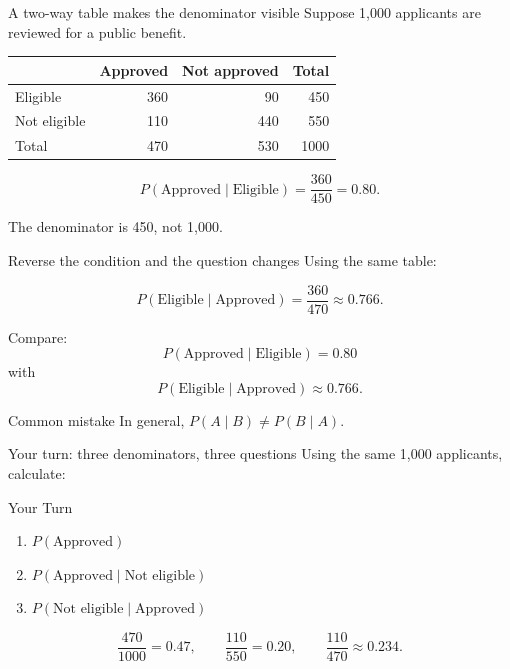 \documentclass[11pt,aspectratio=169]{beamer}
\newcommand{\yourturn}[1]{%
\begin{center}
\begin{minipage}{0.90\textwidth}
\begin{alertblock}{Your Turn}
#1
\end{alertblock}
\end{minipage}
\end{center}}
\newcommand{\prob}[1]{P\!\left(#1\right)}
\newcommand{\condprob}[2]{P\!\left(#1\mid #2\right)}
\begin{document}
\begin{frame}{A two-way table makes the denominator visible}
Suppose 1,000 applicants are reviewed for a public benefit.

\begin{center}
\renewcommand{\arraystretch}{1.25}
\begin{tabular}{lrrr}
\toprule
 & \textbf{Approved} & \textbf{Not approved} & \textbf{Total} \\
\midrule
Eligible & 360 & 90 & 450 \\
Not eligible & 110 & 440 & 550 \\
\midrule
Total & 470 & 530 & 1000 \\
\bottomrule
\end{tabular}
\end{center}

\vspace{0.7em}
\[
\condprob{\text{Approved}}{\text{Eligible}}
=\frac{360}{450}=\boxed{0.80}.
\]

The denominator is \alert{450}, not 1,000.
\end{frame}

\begin{frame}{Reverse the condition and the question changes}
Using the same table:

\[
\condprob{\text{Eligible}}{\text{Approved}}
=\frac{360}{470}\approx\boxed{0.766}.
\]

Compare:
\[
\condprob{\text{Approved}}{\text{Eligible}}=0.80
\]
with
\[
\condprob{\text{Eligible}}{\text{Approved}}\approx0.766.
\]

\vfill
\begin{alertblock}{Common mistake}
In general, $\condprob{A}{B}\neq\condprob{B}{A}$.
\end{alertblock}
\end{frame}

\begin{frame}{Your turn: three denominators, three questions}
Using the same 1,000 applicants, calculate:

\yourturn{\begin{enumerate}
  \item $\prob{\text{Approved}}$
  \item $\condprob{\text{Approved}}{\text{Not eligible}}$
  \item $\condprob{\text{Not eligible}}{\text{Approved}}$
\end{enumerate}}

\vspace{0.5em}
\[
\frac{470}{1000}=0.47,\qquad
\frac{110}{550}=0.20,\qquad
\frac{110}{470}\approx0.234.
\]
\end{frame}
\end{document}
